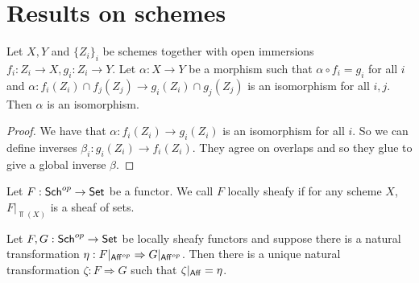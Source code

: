 \documentclass{memoir}
\begin{document}
\section{Results on schemes}
\begin{proposition}
    Let $X, Y$ and $\{Z_i\}_i$ be schemes together with open immersions $f_i:Z_i\to X, g_i:Z_i\to Y$.
    Let $\alpha:X\to Y$ be a morphism such that $\alpha\circ f_i = g_i$ for all $i$ and $\alpha:f_i(Z_i)\cap f_j(Z_j) \to g_i(Z_i)\cap g_j(Z_j)$ is an isomorphism for all $i,j$.
    Then $\alpha$ is an isomorphism.
\end{proposition}
\begin{proof}
    We have that $\alpha:f_i(Z_i)\to g_i(Z_i)$ is an isomorphism for all $i$.
    So we can define inverses $\beta_i:g_i(Z_i)\to f_i(Z_i)$.
    They agree on overlaps and so they glue to give a global inverse $\beta$.
\end{proof}
\begin{definition}
    Let $F:{\normalfont\mathsf{Sch}}^{op}\to {\normalfont\mathsf{Set}}$ be a functor.
    We call $F$ locally sheafy if for any scheme $X$, $F|_{\Top(X)}$ is a sheaf of sets.
\end{definition}
\begin{thm}
    Let $F,G:{\normalfont\mathsf{Sch}}^{op}\to {\normalfont\mathsf{Set}}$ be locally sheafy functors and suppose there is a natural transformation $\eta:F|_{{\normalfont\mathsf{Aff}}^{op}}\Rightarrow G|_{{\normalfont\mathsf{Aff}}^{op}}$.
    Then there is a unique natural transformation $\zeta:F\Rightarrow G$ such that $\zeta|_{{\normalfont\mathsf{Aff}}} = \eta$.
\end{thm}
\end{document}
